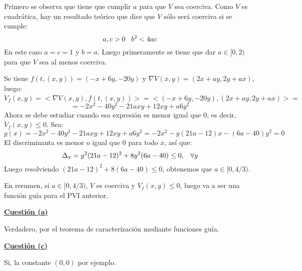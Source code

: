 \documentclass[12pt]{article}
\theoremstyle{definition}
\theoremstyle{remark}
\begin{document}
Primero se observa que tiene que cumplir $a$ para que $V$ sea coerciva. Como $V$ es cuadrática, hay un resultado teórico que dice que $V$ sólo será coerciva si se cumple:
\[
a,c>0 \;\;\; b^2<4ac
\] 
En este caso $a=c=1$ y $b=a$. Luego primeramente se tiene que dar $a\in[0,2)$ para que $V$ sea al menos coerciva.

Se tiene $f(t,(x,y))=(-x+6y,-20y)$ y $\nabla V(x,y)=(2x+ay,2y+ax)$, luego:
\[
\dot{V}_f(x,y)=<\nabla V(x,y), f(t,(x,y))>=<(-x+6y,-20y),(2x+ay,2y+ax)>=
\]
\[
=-2x^2-40y^2-21axy+12xy+a6y^2
\]
Ahora se debe estudiar cuando esa expresión es menor igual que 0, es decir, $\dot{V}_f(x,y)\leq 0$. Sea: 
\[
g(x)=-2x^2-40y^2-21axy+12xy+a6y^2=-2x^2-y(21a-12)x-(6a-40)y^2=0
\]
El discriminanta es menor o igual que 0 para todo $x$, así que:
\[
\Delta_x=y^2(21a-12)^2+8y^2(6a-40)\leq 0, \;\;\; \forall y 
\]
Luego resolviendo $(21a-12)^2+8(6a-40)\leq 0$, obtenemos que $a\in[0,4/3)$.

En resumen, si $a\in[0,4/3)$, $V$ es coerciva y $\dot{V}_f(x,y)\leq 0$, luego va a ser una función guía para el PVI anterior.

\underline{\textbf{Cuestión (a)}}

Verdadero, por el teorema de caracterización mediante funciones guía.

\underline{\textbf{Cuestión (c)}}

Si, la constante $(0,0)$ por ejemplo.
\end{document}
